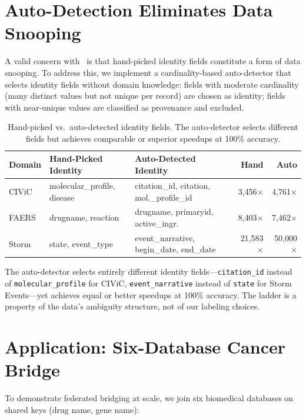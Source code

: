 \documentclass[11pt]{article}
\begin{document}
\section{Auto-Detection Eliminates Data Snooping}\label{sec:autodetect}

A valid concern with~\cite{elms2026dw} is that hand-picked identity fields constitute a form of data snooping. To address this, we implement a cardinality-based auto-detector that selects identity fields without domain knowledge: fields with moderate cardinality (many distinct values but not unique per record) are chosen as identity; fields with near-unique values are classified as provenance and excluded.

\begin{table}[h]
\centering
\begin{tabular}{lllrr}
\toprule
Domain & Hand-Picked Identity & Auto-Detected Identity & Hand & Auto \\
\midrule
CIViC & molecular\_profile, disease & citation\_id, citation, mol.\_profile\_id & 3{,}456$\times$ & 4{,}761$\times$ \\
FAERS & drugname, reaction & drugname, primaryid, active\_ingr. & 8{,}403$\times$ & 7{,}462$\times$ \\
Storm & state, event\_type & event\_narrative, begin\_date, end\_date & 21{,}583$\times$ & 50{,}000$\times$ \\
\bottomrule
\end{tabular}
\caption{Hand-picked vs.\ auto-detected identity fields. The auto-detector selects different fields but achieves comparable or superior speedups at 100\% accuracy.}
\label{tab:autodetect}
\end{table}

The auto-detector selects entirely different identity fields---\texttt{citation\_id} instead of \texttt{molecular\_profile} for CIViC, \texttt{event\_narrative} instead of \texttt{state} for Storm Events---yet achieves equal or better speedups at 100\% accuracy. The ladder is a property of the data's ambiguity structure, not of our labeling choices.

\section{Application: Six-Database Cancer Bridge}

To demonstrate federated bridging at scale, we join six biomedical databases on shared keys (drug name, gene name):
\end{document}
